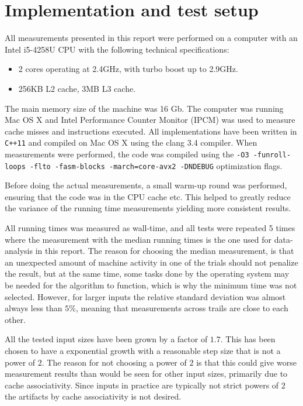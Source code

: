 \documentclass[twoside,11pt,openright]{report}
\begin{document}
\section{Implementation and test setup}
All measurements presented in this report were performed on a computer with an Intel i5-4258U CPU with the following technical specifications:
\begin{itemize}
  \item 2 cores operating at 2.4GHz, with turbo boost up to 2.9GHz.
  \item 256KB L2 cache, 3MB L3 cache.
\end{itemize}
The main memory size of the machine was 16 Gb. The computer was running Mac OS X and Intel Performance Counter Monitor (IPCM) was used to measure cache misses and instructions executed. All implementations have been written in \texttt{C++11} and compiled on  Mac OS X using the clang 3.4 compiler. When measurements were performed, the code was compiled using the \texttt{-O3 -funroll-loops -flto -fasm-blocks -march=core-avx2 -DNDEBUG} optimization flags.

Before doing the actual measurements, a small warm-up round was performed, ensuring that the code was in the CPU cache etc. This helped to greatly reduce the variance of the running time measurements yielding more consistent results.

All running times was measured as wall-time, and all tests were repeated 5 times where the measurement with the median running times is the one used for data-analysis in this report. The reason for choosing the median measurement, is that an unexpected amount of machine activity in one of the trials should not penalize the result, but at the same time, some tasks done by the operating system may be needed for the algorithm to function, which is why the minimum time was not selected. However, for larger inputs the relative standard deviation was almost always less than $5\%$, meaning that measurements across trails are close to each other.

All the tested input sizes have been grown by a factor of $1.7$. This has been chosen to have a exponential growth with a reasonable step size that is not a power of $2$. The reason for not choosing a power of $2$ is that this could give worse measurement results than would be seen for other input sizes, primarily due to cache associativity. Since inputs in practice are typically not strict powers of $2$ the artifacts by cache associativity is not desired.
\end{document}
